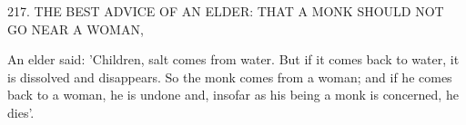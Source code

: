217. THE BEST ADVICE OF AN ELDER:
THAT A MONK SHOULD NOT GO NEAR A WOMAN,

An elder said: 'Children, salt comes from water. But if it comes
back to water, it is dissolved and disappears. So the monk comes
from a woman; and if he comes back to a woman, he is undone
and, insofar as his being a monk is concerned, he dies'.


